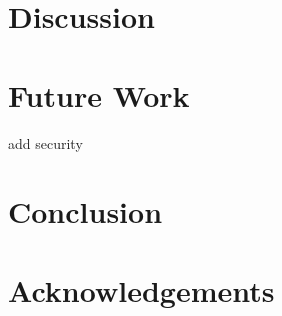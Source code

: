 \section{Discussion}
\section{Future Work}
add security
\section{Conclusion}
\section{Acknowledgements}

